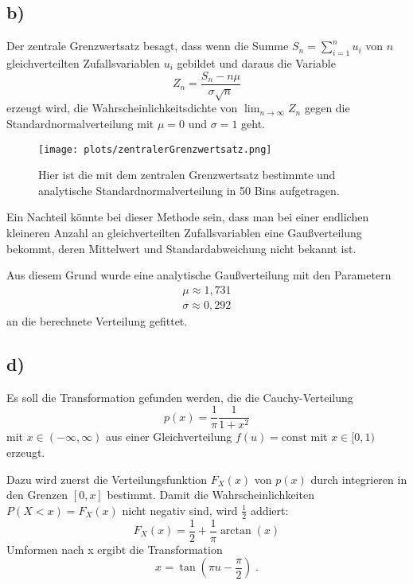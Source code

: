 \subsection{b)}
    Der zentrale Grenzwertsatz besagt, dass wenn die Summe $S_n = \sum_{i=1}^n u_i$ von $n$ gleichverteilten Zufallsvariablen $u_i$ gebildet und daraus die Variable
    \begin{equation}
        Z_n = \frac{S_n - n\mu}{\sigma \sqrt{n}}
    \end{equation}
    erzeugt wird, die Wahrscheinlichkeitsdichte von $\lim_{n \rightarrow \infty} Z_n$ gegen die Standardnormalverteilung mit $\mu=0$ und $\sigma=1$ geht.
    
    \begin{figure}[H]
        \centering
        \texttt{[image: plots/zentralerGrenzwertsatz.png]} \vspace*{-0.5cm}
        \caption{Hier ist die mit dem zentralen Grenzwertsatz bestimmte und analytische Standardnormalverteilung in 50 Bins aufgetragen.}
        \label{fig:zentralerGrenzwertsatz}
    \end{figure}
    \FloatBarrier

    Ein Nachteil könnte bei dieser Methode sein, dass man bei einer endlichen kleineren Anzahl an gleichverteilten Zufallsvariablen eine Gaußverteilung bekommt, deren Mittelwert und Standardabweichung nicht bekannt ist.

    Aus diesem Grund wurde eine analytische Gaußverteilung mit den Parametern
    \begin{align*}
        \mu \approx 1,731 \\
        \sigma \approx 0,292
    \end{align*}
    an die berechnete Verteilung gefittet.


\subsection{d)}
    Es soll die Transformation gefunden werden, die die Cauchy-Verteilung
    \begin{equation}
        p(x) = \frac{1}{\pi} \frac{1}{1 + x^2}
    \end{equation}
    mit $x \in (-\infty, \infty)$ aus einer Gleichverteilung $f(u)=\mathrm{const}$ mit $x \in [0, 1)$ erzeugt.

    Dazu wird zuerst die Verteilungsfunktion $F_X(x)$ von $p(x)$ durch integrieren in den Grenzen $[0, x]$ bestimmt.
    Damit die Wahrscheinlichkeiten $P(X < x) = F_X(x)$ nicht negativ sind, wird $\frac{1}{2}$ addiert:
    \begin{equation}
        F_X(x) = \frac{1}{2} + \frac{1}{\pi} \arctan(x)
    \end{equation}
    Umformen nach x ergibt die Transformation
    \begin{equation}
        x = \tan(\pi u - \frac{\pi}{2}) \;.
    \end{equation}

